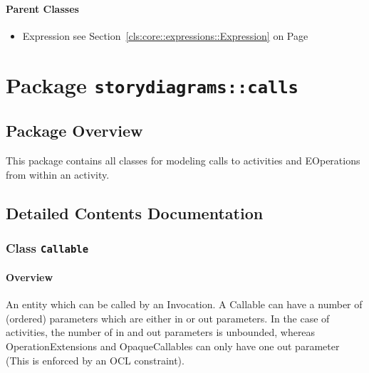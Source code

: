 	



\paragraph{Parent Classes}
\begin{itemize}
\item Expression see Section~\ref{cls:core::expressions::Expression} on Page~\pageref{cls:core::expressions::Expression}\end{itemize}
\newpage
		


\section{Package \bfseries \texttt{storydiagrams::calls}\normalfont}
\subsection{Package Overview}
	
			
This package contains all classes for modeling calls to activities and EOperations
from within an activity.	
		
	
			
		



\subsection{Detailed Contents Documentation}
\subsubsection{\Large{Class \bfseries \texttt{Callable}\normalfont}}
\label{cls:storydiagrams::calls::Callable} 
\paragraph{Overview}

	
			
An entity which can be called by an Invocation. A Callable can have a number of (ordered) parameters which are either in or out parameters. In the case of activities, the number of in and out parameters is unbounded, whereas OperationExtensions and OpaqueCallables can only have one out parameter (This is enforced by an OCL constraint).	
		
